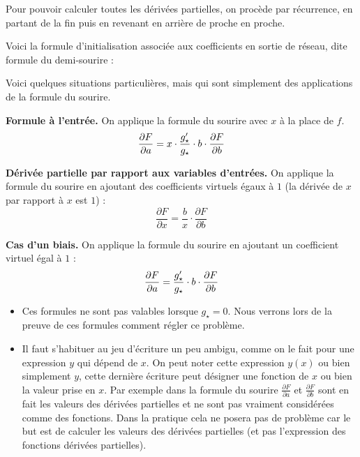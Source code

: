 {\bigskip

Pour pouvoir calculer toutes les dérivées partielles, on procède par récurrence, en partant de la fin puis en revenant en arrière de proche en proche. 


Voici la formule d'initialisation associée aux coefficients en sortie de réseau, dite \og{}formule du demi-sourire\fg{} :


\bigskip

Voici quelques situations particulières, mais qui sont simplement des applications de la formule du sourire.

\textbf{Formule à l'entrée.} On applique la formule du sourire avec $x$ à la place de $f$.
$$\frac{\partial F}{\partial a} = x \cdot \frac{g'_\star}{g_\star} \cdot b \cdot \frac{\partial F}{\partial b}$$ 

\textbf{Dérivée partielle par rapport aux variables d'entrées.}
On applique la formule du sourire en ajoutant des coefficients virtuels égaux à $1$ (la dérivée de $x$ par rapport à $x$ est $1$) :
$$\frac{\partial F}{\partial x} = \frac{b}{x} \cdot \frac{\partial F}{\partial b}$$


\textbf{Cas d'un biais.} On applique la formule du sourire en ajoutant un coefficient virtuel égal à $1$ :
$$\frac{\partial F}{\partial a} = \frac{g'_\star}{g_\star} \cdot b \cdot \frac{\partial F}{\partial b}$$ 


	\begin{itemize}
		\item Ces formules ne sont pas valables lorsque $g_\star=0$. Nous verrons lors de la preuve de ces formules comment régler ce problème.
		
		\item Il faut s'habituer au jeu d'écriture un peu ambigu, comme on le fait pour une expression $y$ qui dépend de $x$. On peut noter cette expression $y(x)$ ou bien simplement $y$, cette dernière écriture peut désigner une fonction de $x$ ou bien la valeur prise en $x$. Par exemple dans la formule du sourire  $\frac{\partial F}{\partial a}$ et $ \frac{\partial F}{\partial b}$ sont en fait les valeurs des dérivées partielles et ne sont pas vraiment considérées comme des fonctions. Dans la pratique cela ne posera pas de problème car le but est de calculer les valeurs des dérivées partielles (et pas l'expression des fonctions dérivées partielles).
		

\end{itemize}}
